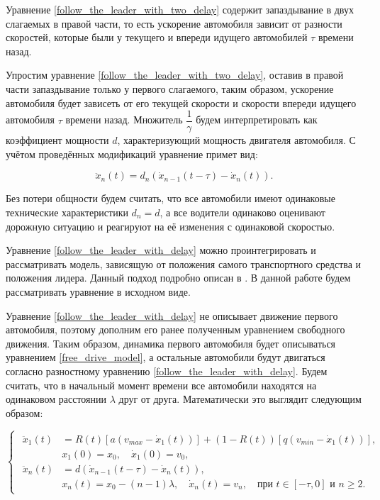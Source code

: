 \documentclass[12pt, a4paper]{extarticle}
\numberwithin{equation}{section}
\numberwithin{figure}{section}
\begin{document}
Уравнение \eqref{follow_the_leader_with_two_delay} содержит запаздывание в двух слагаемых в правой части, то есть ускорение автомобиля зависит от разности скоростей, которые были у текущего и впереди идущего автомобилей $\tau$ времени назад.

Упростим уравнение \eqref{follow_the_leader_with_two_delay}, оставив в правой части запаздывание только у первого слагаемого, таким образом, ускорение автомобиля будет зависеть от его текущей скорости и скорости впереди идущего автомобиля $\tau$ времени назад. Множитель $\dfrac{1}{\gamma}$ будем интерпретировать как коэффициент мощности $d$, характеризующий мощность двигателя автомобиля. С учётом проведённых модификаций уравнение примет вид:

\begin{equation} \label{follow_the_leader_with_delay}
\ddot{x}_n(t) = d_{n} (\dot{x}_{n-1}(t-\tau) - \dot{x}_{n}(t)).
\end{equation}

Без потери общности будем считать, что все автомобили имеют одинаковые технические характеристики $d_n = d$, а все водители одинаково оценивают дорожную ситуацию и реагируют на её изменения с одинаковой скоростью.

Уравнение \eqref{follow_the_leader_with_delay} можно проинтегрировать и рассматривать модель, зависящую от положения самого транспортного средства и положения лидера. Данный подход подробно описан в \cite{Course}. В данной работе будем рассматривать уравнение в исходном виде. 

Уравнение \eqref{follow_the_leader_with_delay} не описывает движение первого автомобиля, поэтому дополним его ранее полученным уравнением свободного движения. Таким образом, динамика первого автомобиля будет описываться уравнением \eqref{free_drive_model}, а остальные автомобили будут двигаться согласно разностному уравнению \eqref{follow_the_leader_with_delay}. Будем считать, что в начальный момент времени все автомобили находятся на одинаковом расстоянии $\lambda$ друг от друга. Математически это выглядит следующим образом:

\begin{equation} \label{follow_the_leader_full_model}
\begin{cases}
\begin{split}
\ddot{x}_1(t)& = R(t) \left[ a\left(v_{max}-\dot{x}_1(t) \right)\right] + (1-R(t)) \left[ q\left( v_{min} - \dot{x}_1(t)\right) \right], \\
&x_{1}(0)=x_0, \quad \dot{x}_{1}(0)=v_{0},\\
\ddot{x}_{n}(t)& = d(\dot{x}_{n-1}(t-\tau)-\dot{x}_{n}(t)), \\
&x_n(t)=x_0-(n-1)\lambda, \quad \dot{x}_n(t)=v_{n}, \quad \text{при } t \in [-\tau,0] \text{ и } n\geq2.
\end{split}
\end{cases}
\end{equation}
\end{document}
